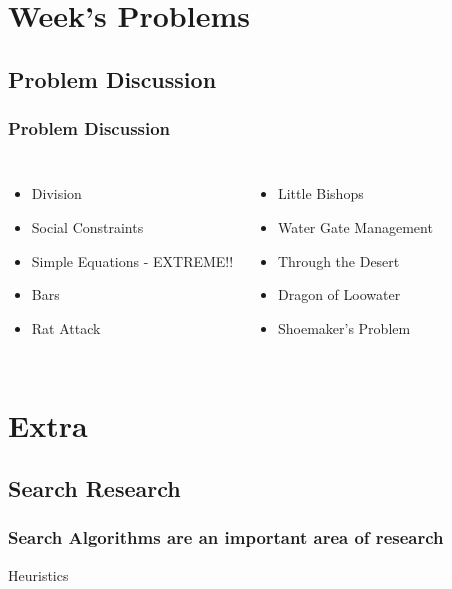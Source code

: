 \documentclass{beamer}
\begin{document}
\section{Week's Problems}
\subsection{Problem Discussion}
\begin{frame}
  \frametitle{Problem Discussion}
  \begin{columns}
    \begin{itemize}
    \item Division
    \item Social Constraints
    \item Simple Equations - EXTREME!!
    \item Bars
    \item Rat Attack
    \end{itemize}
    \begin{itemize}
    \item Little Bishops
    \item Water Gate Management
    \item Through the Desert
    \item Dragon of Loowater
    \item Shoemaker's Problem
    \end{itemize}
  \end{columns}
\end{frame}


\section{Extra}
\subsection{Search Research}
\begin{frame}
  \frametitle{Search Algorithms are an important area of research}
  Heuristics
\end{frame}
\end{document}
